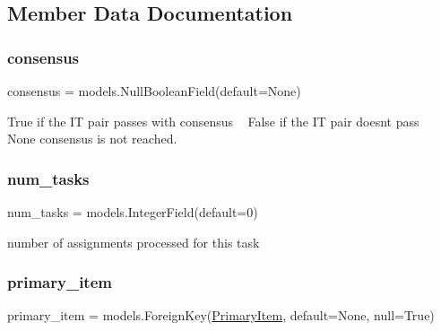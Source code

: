 \subsection{Member Data Documentation}
\mbox{\label{classjoinapp_1_1models_1_1task__management__models_1_1_p_j_f_task_acd4d1b3226891bb64f1fb71cff3a390e}} 
\subsubsection{\texorpdfstring{consensus}{consensus}}
{\footnotesize\ttfamily consensus = models.\+Null\+Boolean\+Field(default=None)\hspace{0.3cm}{\ttfamily [static]}}



True if the IT pair passes with consensus ~\newline
 False if the IT pair doesn\textquotesingle{}t pass ~\newline
 None consensus is not reached. 

\mbox{\label{classjoinapp_1_1models_1_1task__management__models_1_1_p_j_f_task_afc259a6f918180e978f96108b03d3411}} 
\subsubsection{\texorpdfstring{num\_tasks}{num\_tasks}}
{\footnotesize\ttfamily num\+\_\+tasks = models.\+Integer\+Field(default=0)\hspace{0.3cm}{\ttfamily [static]}}



number of assignments processed for this task 

\mbox{\label{classjoinapp_1_1models_1_1task__management__models_1_1_p_j_f_task_aba1ada8f72cc448a543f1b01551172fa}} 
\subsubsection{\texorpdfstring{primary\_item}{primary\_item}}
{\footnotesize\ttfamily primary\+\_\+item = models.\+Foreign\+Key(\textquotesingle{}\mbox{\hyperlink{classjoinapp_1_1models_1_1items_1_1_primary_item}{Primary\+Item}}\textquotesingle{}, default=None, null=True)\hspace{0.3cm}{\ttfamily [static]}}



